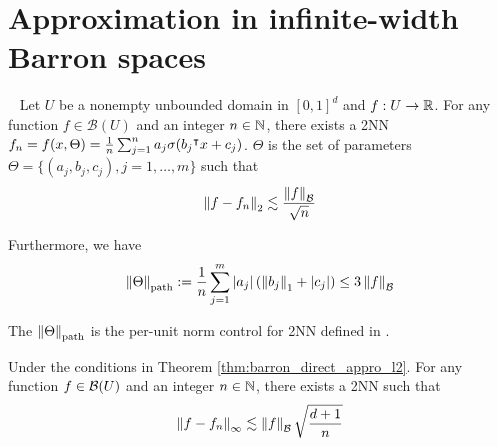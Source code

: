 \section{Approximation in infinite-width Barron spaces}
\label{sec:appro_barron_space}

\begin{theorem} \
    \label{thm:barron_direct_appro_l2}
    Let $U$ be a nonempty unbounded domain in $[0,1]^d$ and $f: U \to \mathbb{R}$. For
    any function $f \in \mathcal{B}(U)$ and an integer $n \in \mathbb{N}$, there
    exists a 2NN $f_n = f(x, \Theta) = \frac{1}{n}\sum_{j=1}^n a_j \sigma(b_j{}^{\intercal}
    x + c_j)$. $\Theta$ is the set of parameters $\Theta = \{(a_j, b_j, c_j),
    j=1,\dots,m\}$ such that
    \begin{equation*}
        \left\| f - f_n \right\|_2 \lesssim \frac{\left\| f \right\|_{\mathcal{B}}}{\sqrt{n}}
    \end{equation*}

    Furthermore, we have
    \begin{equation}
        \left\| \Theta \right\|_{\textnormal{path}} 
        := \frac{1}{n} \sum_{j=1}^m \left| a_j \right| 
        (
            \left\| b_j \right\|_1 + \left| c_j \right|
        )
        \leq 3\left\| f \right\|_{\mathcal{B}}
    \end{equation}
\end{theorem}

The $\left\| \Theta \right\|_{\textnormal{path}}$ is the per-unit norm control for 2NN
defined in \cite{neyshaburNormBasedCapacityControl2015}. 

\begin{theorem}
    Under the conditions in Theorem \ref{thm:barron_direct_appro_l2}. For any
    function $f \in \mathcal{B}(U)$ and an integer $n \in \mathbb{N}$, there exists a 2NN
    such that
    \begin{equation*}
        \left\| f - f_n \right\|_{\infty} \lesssim 
        \left\| f \right\|_{\mathcal{B}} \sqrt{\frac{d+1}{n}}
    \end{equation*}
\end{theorem}







